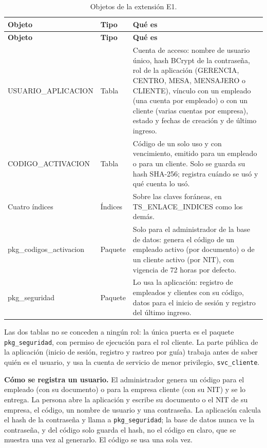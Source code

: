 {\singlespacing\small
\begin{longtable}{L{3.6cm} L{2.2cm} L{8.2cm}}
\caption{Objetos de la extensión E1.}
\label{tab:proto-e1}\\
\toprule
\textbf{Objeto} & \textbf{Tipo} & \textbf{Qué es} \\
\midrule
\endfirsthead
\toprule
\textbf{Objeto} & \textbf{Tipo} & \textbf{Qué es} \\
\midrule
\endhead
\bottomrule
\endfoot
USUARIO\_\allowbreak APLICACION & Tabla & Cuenta de acceso: nombre de usuario único, hash BCrypt de la contraseña, rol de la aplicación (GERENCIA, CENTRO, MESA, MENSAJERO o CLIENTE), vínculo con un empleado (una cuenta por empleado) o con un cliente (varias cuentas por empresa), estado y fechas de creación y de último ingreso. \\
CODIGO\_\allowbreak ACTIVACION & Tabla & Código de un solo uso y con vencimiento, emitido para un empleado o para un cliente. Solo se guarda su hash SHA-256; registra cuándo se usó y qué cuenta lo usó. \\
Cuatro índices & Índices & Sobre las claves foráneas, en TS\_ENLACE\_INDICES como los demás. \\
pkg\_codigos\_\allowbreak activacion & Paquete & Solo para el administrador de la base de datos: genera el código de un empleado activo (por documento) o de un cliente activo (por NIT), con vigencia de 72 horas por defecto. \\
pkg\_seguridad & Paquete & Lo usa la aplicación: registro de empleados y clientes con su código, datos para el inicio de sesión y registro del último ingreso. \\
\end{longtable}
\par}

Las dos tablas no se conceden a ningún rol: la única puerta es el paquete
\texttt{pkg\_seguridad}, con permiso de ejecución para el rol cliente. La
parte pública de la aplicación (inicio de sesión, registro y rastreo por
guía) trabaja antes de saber quién es el usuario, y usa la cuenta de
servicio de menor privilegio, \texttt{svc\_cliente}.

\textbf{Cómo se registra un usuario.} El administrador genera un código para
el empleado (con su documento) o para la empresa cliente (con su NIT) y se
lo entrega. La persona abre la aplicación y escribe su documento o el NIT
de su empresa, el código, un nombre de usuario y una contraseña. La
aplicación calcula el hash de la contraseña y llama a \texttt{pkg\_seguridad};
la base de datos nunca ve la contraseña, y del código solo guarda el hash, no el
código en claro, que se muestra una vez al generarlo. El código se usa una
sola vez.

